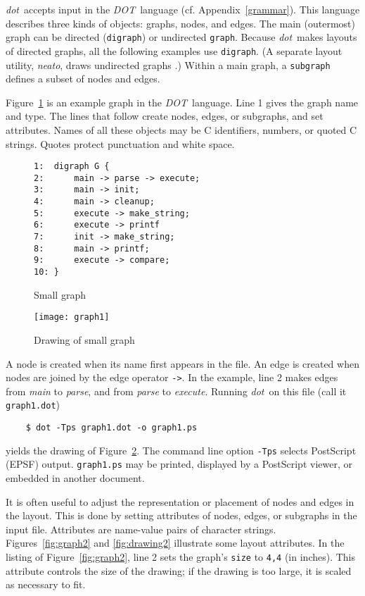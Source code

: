\documentclass[11pt]{article}
\def\dot{{\it dot}}
\def\DOT{{\it DOT}}
\begin{document}
\dot\ accepts input in the \DOT\ language (cf. Appendix~\ref{grammar}). 
This language describes three kinds of objects:
graphs, nodes, and edges.
The main (outermost) graph can be directed
({\tt digraph}) or undirected {\tt graph}.
Because \dot\ makes layouts of directed graphs,
all the following examples use {\tt digraph}.
(A separate layout utility, {\it neato},
draws undirected graphs \cite{neatoguide}.)
Within a main graph, a {\tt subgraph} defines a
subset of nodes and edges.

Figure~\ref{fig:graph1} is an example graph in the \DOT\ language. 
Line 1 gives the graph name and type.
The lines that follow create nodes, edges, or subgraphs,
and set attributes. Names of all these objects may be
C identifiers, numbers, or quoted C strings.
Quotes protect punctuation and white space.

\begin{figure}[p]
\begin{verbatim}
1:  digraph G {
2:      main -> parse -> execute;
3:      main -> init;
4:      main -> cleanup;
5:      execute -> make_string;
6:      execute -> printf
7:      init -> make_string;
8:      main -> printf;
9:      execute -> compare;
10: }
\end{verbatim}
\caption{Small graph}
\label{fig:graph1}
\end{figure}

\begin{figure}[p]
	\centerline {
		\texttt{[image: graph1]}
	}
    \caption{Drawing of small graph}
    \label{fig:drawing1}
\end{figure}

A node is created when its name first appears in the file.
An edge is created when nodes are joined by the edge operator \verb"->".
In the example, line 2 makes edges from {\it main} to {\it parse},
and from {\it parse} to {\it execute}.
Running \dot\ on this file (call it \verb"graph1.dot")
\begin{verbatim}
    $ dot -Tps graph1.dot -o graph1.ps
\end{verbatim}
yields the drawing of Figure~\ref{fig:drawing1}.
The command line option \verb"-Tps" selects PostScript (EPSF) output. 
\verb"graph1.ps" may be printed, displayed by a PostScript viewer,
or embedded in another document.

It is often useful to adjust the representation or placement of nodes
and edges in the layout.  This is done by setting attributes of nodes,
edges, or subgraphs in the input file.
Attributes are name-value pairs of character strings.
Figures~\ref{fig:graph2} and \ref{fig:drawing2} illustrate
some layout attributes.  In the listing of Figure~\ref{fig:graph2},
line 2 sets the graph's {\tt size} to {\tt 4,4}
(in inches).
This attribute controls the size of the drawing; if the drawing is
too large, it is scaled as necessary to fit.
\end{document}
